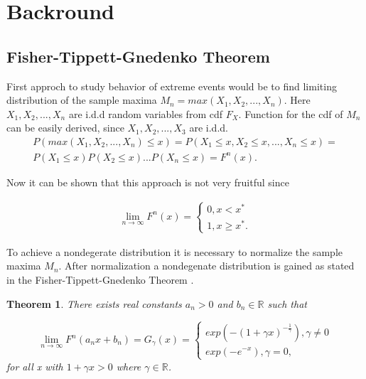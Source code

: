 \documentclass[english,12pt,a4paper,pdftex,sci,utf8]{aaltothesis} %
\newtheorem{theorem}{Theorem}[section]
\begin{document}
\clearpage

\section{Backround}

\subsection{Fisher-Tippett-Gnedenko Theorem}

First approch to study behavior of extreme events would be to find limiting distribution of the sample maxima $M_n = max(X_1, X_2, ..., X_n)$. Here $X_1, X_2, ..., X_n$ are i.d.d random variables from cdf $F_X$. Function for the cdf of $M_n$ can be easily derived, since $X_1, X_2,..., X_3$ are i.d.d.
\begin{gather*}
P(max(X_1, X_2, ... , X_n) \leq x) = P(X_1 \leq x, X_2 \leq x,..., X_n \leq x) = \\
P(X_1 \leq x) P(X_2 \leq x) ... P(X_n \leq x) =  F^n(x).
\end{gather*}

Now it can be shown that this approach is not very fruitful since

\begin{gather*}
\lim_{n\to\infty} F^n(x) = 
\begin{cases}
0, x < x^* \\
1, x \geq x^*.
\end{cases}
\end{gather*}

To achieve a nondegerate distribution it is necessary to normalize the sample maxima $M_n$. After normalization a nondegenate distribution is gained as stated in the Fisher-Tippett-Gnedenko Theorem \cite{deHaan}.

\begin{theorem}
There exists real constants $a_n>0$ and $b_n \in \mathbb{R}$ such that 

\begin{equation}
\lim_{n\to\infty} F^n(a_nx + b_n) = G_{\gamma}(x) =
\begin{cases}
exp(-(1 + \gamma x)^{-\frac{1}{\gamma}}), \gamma \neq 0 \\
exp(-e^{-x}), \gamma = 0,
\end{cases}
\label{mdaEq}
\end{equation}
for all x with $1+\gamma x > 0$ where $\gamma \in \mathbb{R}$.

\end{theorem}
\end{document}
